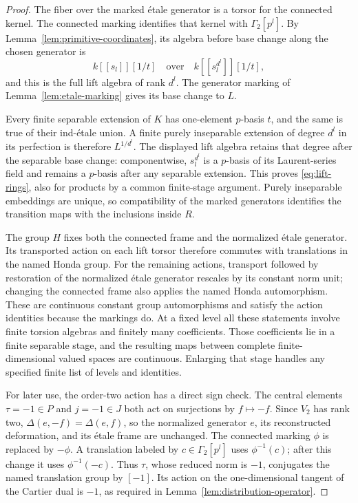 \begin{proof}
The fiber over the marked étale generator is a torsor for the
connected kernel.  The connected marking identifies that
kernel with $\Gamma_2[p^l]$.
By Lemma~\ref{lem:primitive-coordinates}, its algebra before
base change along the chosen generator is
\[
 k[[s_l]][1/t]
 \quad\text{over}\quad
 k[[s_l^{d^l}]][1/t],
\]
and this is the full lift algebra of rank $d^l$.
The generator marking of Lemma~\ref{lem:etale-marking}
gives its base change to $L$.

Every finite separable extension of $K$ has one-element
$p$-basis $t$, and the same is true of their ind-étale union.
A finite purely inseparable extension of degree $d^l$ in
its perfection is therefore $L^{1/d^l}$.  The displayed lift
algebra retains that degree after the separable base change:
componentwise, $s_l^{d^l}$ is a $p$-basis of its Laurent-series
field and remains a $p$-basis after any separable extension.
This proves \eqref{eq:lift-rings}, also for products by a
common finite-stage argument.  Purely inseparable embeddings
are unique, so compatibility of the marked generators
identifies the transition maps with the inclusions inside $R$.

The group $H$ fixes both the connected frame and the normalized
étale generator.  Its transported action on each lift torsor
therefore commutes with translations in the named Honda group.
For the remaining actions, transport followed by restoration
of the normalized étale generator rescales by its constant
norm unit; changing the connected frame also applies the named
Honda automorphism.  These are continuous constant group
automorphisms and satisfy the action identities because the
markings do.  At a fixed level all these statements involve
finite torsion algebras and finitely many coefficients.  Those
coefficients lie in a finite separable stage, and the resulting
maps between complete finite-dimensional valued spaces are
continuous.  Enlarging that stage handles any specified finite
list of levels and identities.

For later use, the order-two action has a direct sign check.
The central elements $\tau=-1\in P$ and $j=-1\in J$ both act
on surjections by $f\mapsto-f$.  Since $V_2$ has rank two,
$\Delta(e,-f)=\Delta(e,f)$, so the normalized generator $e$,
its reconstructed deformation, and its étale frame are unchanged.
The connected marking $\phi$ is replaced by $-\phi$.
A translation labeled by $c\in\Gamma_2[p^l]$ uses
$\phi^{-1}(c)$; after this change it uses $\phi^{-1}(-c)$.
Thus $\tau$, whose reduced norm is $-1$, conjugates the named
translation group by $[-1]$.  Its action on the one-dimensional
tangent of the Cartier dual is $-1$, as required in
Lemma~\ref{lem:distribution-operator}.
\end{proof}

